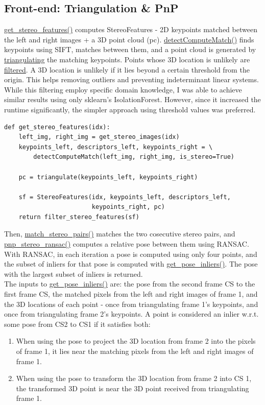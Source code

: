 \documentclass[12pt]{article}
\begin{document}
\subsection{Front-end: Triangulation \& PnP}
\href{TODO}{get_stereo_features()} computes StereoFeatures - 2D keypoints matched between the left and right images + a 3D point cloud (pc). \href{TODO}{detectComputeMatch()} finds keypoints using SIFT, matches between them, and a point cloud is generated by \href{TODO}{triangulating} the matching keypoints. Points whose 3D location is unlikely are \href{TODO}{filtered}. A 3D location is unlikely if it lies beyond a certain threshold from the origin. This helps removing outliers and preventing indeterminant linear systems. While this filtering employ specific domain knowledge, I was able to achieve similar results using only sklearn's IsolationForest. However, since it increased the runtime significantly, the simpler approach using threshold values was preferred.
\begin{tcolorbox}
\begin{verbatim}  
def get_stereo_features(idx):
    left_img, right_img = get_stereo_images(idx)
    keypoints_left, descriptors_left, keypoints_right = \
        detectComputeMatch(left_img, right_img, is_stereo=True)
    
    pc = triangulate(keypoints_left, keypoints_right)
    
    sf = StereoFeatures(idx, keypoints_left, descriptors_left,
                        keypoints_right, pc)
    return filter_stereo_features(sf)
\end{verbatim}
\end{tcolorbox}
Then, \href{TODO}{match_stereo_pairs()} matches the two cosecutive stereo pairs, and \href{TODO}{pnp_stereo_ransac()} computes a relative pose between them using RANSAC. With RANSAC, in each iteration a pose is computed using only four points, and the subset of inliers for that pose is computed with \href{TODO}{get_pose_inliers()}. The pose with the largest subset of inliers is returned. \\ 
The inputs to \href{TODO}{get_pose_inliers()} are: the pose from the second frame CS to the first frame CS, the matched pixels from the left and right images of frame 1,  and the 3D locations of each point - once from triangulating frame 1's keypoints, and once from triangulating frame 2's keypoints. A point is considered an inlier w.r.t. some pose from CS2 to CS1 if it satisfies both:
\begin{enumerate}
    \item When using the pose to project the 3D location from frame 2 into the pixels of frame 1, it lies near the matching pixels from the left and right images of frame 1.
    \item When using the pose to transform the 3D location from frame 2 into CS 1, the transformed 3D point is near the 3D point received from triangulating frame 1.
\end{enumerate}
\end{document}
